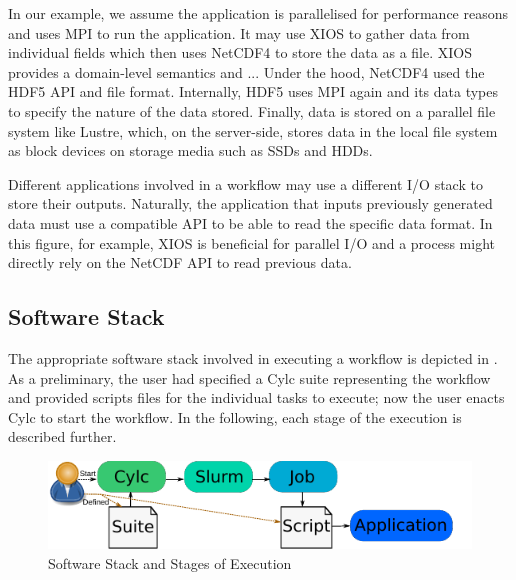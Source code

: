 \documentclass[a4paper]{article}
\newcommand{\jk}[1]{\todo[inline]{JK: #1}}
\begin{document}
\begin{minipage}{0.7\textwidth}
In our example, we assume the application is parallelised for performance reasons and uses MPI to run the application.
It may use XIOS to gather data from individual fields which then uses NetCDF4 to store the data as a file.
XIOS provides a domain-level semantics and ...\jk{TODO}
Under the hood, NetCDF4 used the HDF5 API and file format.
Internally, HDF5 uses MPI again and its data types to specify the nature of the data stored.
Finally, data is stored on a parallel file system like Lustre, which, on the server-side, stores data in the local file system as block devices on storage media such as SSDs and HDDs.

Different applications involved in a workflow may use a different I/O stack to store their outputs.
Naturally, the application that inputs previously generated data must use a compatible API to be able to read the specific data format.
In this figure, for example, XIOS is beneficial for parallel I/O and a process might directly rely on the NetCDF API to read previous data.
\end{minipage}



\subsection{Software Stack}

The appropriate software stack involved in executing a workflow is depicted in .
As a preliminary, the user had specified a Cylc suite representing the workflow and provided scripts files for the individual tasks to execute; now the user enacts Cylc to start the workflow.
In the following, each stage of the execution is described further.

\begin{figure}[H]
  \centering
  \includegraphics[scale=1.4]{stages}
  \caption{Software Stack and Stages of Execution}
  \label{fig:stages}
\end{figure}
\end{document}
